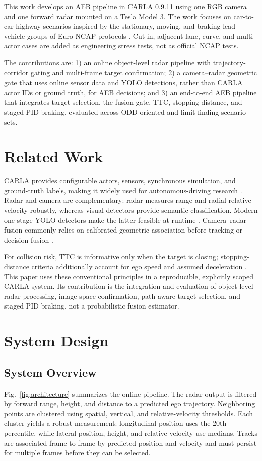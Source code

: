 \documentclass[conference]{IEEEtran}
\begin{document}
This work develops an AEB pipeline in CARLA 0.9.11 using one RGB camera and one
forward radar mounted on a Tesla Model 3. The work focuses on car-to-car highway
scenarios inspired by the stationary, moving, and braking lead-vehicle groups
of Euro NCAP protocols \cite{euroncap_aeb}. Cut-in, adjacent-lane, curve, and
multi-actor cases are added as engineering stress tests, not as official NCAP
tests.

The contributions are: 1) an online object-level radar pipeline with
trajectory-corridor gating and multi-frame target confirmation; 2) a
camera--radar geometric gate that uses online sensor data and YOLO detections,
rather than CARLA actor IDs or ground truth, for AEB decisions; and 3) an
end-to-end AEB pipeline that integrates target selection, the fusion gate, TTC,
stopping distance, and staged PID braking, evaluated across ODD-oriented and
limit-finding scenario sets.

\section{Related Work}
CARLA provides configurable actors, sensors, synchronous simulation, and
ground-truth labels, making it widely used for autonomous-driving research
\cite{dosovitskiy2017carla,carla_sensors}. Radar and camera are complementary:
radar measures range and radial relative velocity robustly, whereas visual
detectors provide semantic classification. Modern one-stage YOLO detectors make
the latter feasible at runtime \cite{ultralytics_yolo}. Camera--radar fusion commonly relies
on calibrated geometric association before tracking or decision fusion
\cite{feng2021multimodal}.

For collision risk, TTC is informative only when the target is closing;
stopping-distance criteria additionally account for ego speed and assumed
deceleration \cite{iso15623}. This paper uses these conventional principles in a
reproducible, explicitly scoped CARLA system. Its contribution is the integration
and evaluation of object-level radar processing, image-space confirmation,
path-aware target selection, and staged PID braking, not a probabilistic fusion
estimator.

\section{System Design}
\subsection{System Overview}
Fig.~\ref{fig:architecture} summarizes the online pipeline. The radar output is
filtered by forward range, height, and distance to a predicted ego trajectory.
Neighboring points are clustered using spatial, vertical, and relative-velocity
thresholds. Each cluster yields a robust measurement: longitudinal position uses
the 20th percentile, while lateral position, height, and relative velocity use
medians. Tracks are associated frame-to-frame by predicted position and velocity
and must persist for multiple frames before they can be selected.
\end{document}
